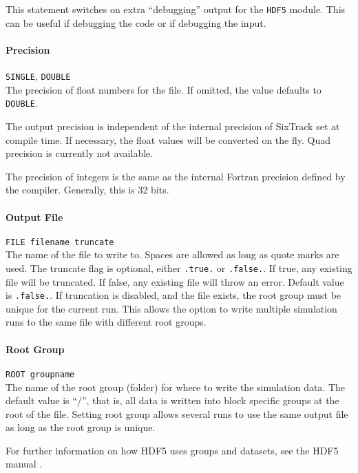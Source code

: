 This statement switches on extra ``debugging'' output for the \texttt{HDF5} module.
This can be useful if debugging the code or if debugging the input.

\paragraph{Precision} \texttt{SINGLE}, \texttt{DOUBLE}\\

The precision of float numbers for the file. If omitted, the value defaults to \texttt{DOUBLE}.

The output precision is independent of the internal precision of SixTrack set at compile time.
If necessary, the float values will be converted on the fly.
Quad precision is currently not available.

The precision of integers is the same as the internal Fortran precision defined by the compiler.
Generally, this is 32 bits.

\paragraph{Output File} \texttt{FILE filename truncate}\\

The name of the file to write to.
Spaces are allowed as long as quote marks are used.
The truncate flag is optional, either \texttt{.true.} or \texttt{.false.}.
If true, any existing file will be truncated.
If false, any existing file will throw an error.
Default value is \texttt{.false.}.
If truncation is disabled, and the file exists, the root group must be unique for the current run.
This allows the option to write multiple simulation runs to the same file with different root groups.

\paragraph{Root Group} \texttt{ROOT groupname}\\

The name of the root group (folder) for where to write the simulation data.
The default value is ``/'', that is, all data is written into block specific groups at the root of the file.
Setting root group allows several runs to use the same output file as long as the root group is unique.

For further information on how HDF5 uses groups and datasets, see the HDF5 manual \cite{h5_doc}.


